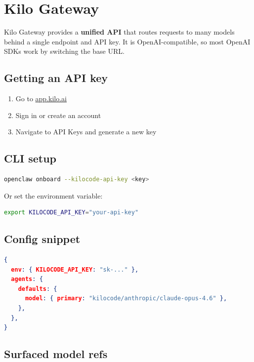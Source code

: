 \clearpage

\section{Kilo Gateway}


Kilo Gateway provides a \textbf{unified API} that routes requests to many models behind a single
endpoint and API key. It is OpenAI-compatible, so most OpenAI SDKs work by switching the base URL.

\subsection{Getting an API key}


\begin{enumerate}
  \item Go to \href{https://app.kilo.ai}{app.kilo.ai}
  \item Sign in or create an account
  \item Navigate to API Keys and generate a new key
\end{enumerate}


\subsection{CLI setup}


\begin{lstlisting}[language=bash]
openclaw onboard --kilocode-api-key <key>
\end{lstlisting}


Or set the environment variable:

\begin{lstlisting}[language=bash]
export KILOCODE_API_KEY="your-api-key"
\end{lstlisting}


\subsection{Config snippet}


\begin{lstlisting}[language=json]
{
  env: { KILOCODE_API_KEY: "sk-..." },
  agents: {
    defaults: {
      model: { primary: "kilocode/anthropic/claude-opus-4.6" },
    },
  },
}
\end{lstlisting}


\subsection{Surfaced model refs}


